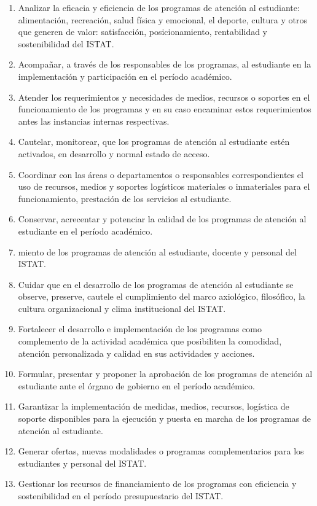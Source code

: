 \begin{enumerate}
\item Analizar la eficacia y eficiencia de los programas de atención al estudiante: alimentación, recreación, salud física y emocional, el deporte, cultura y otros que generen de valor: satisfacción, posicionamiento, rentabilidad y sostenibilidad del ISTAT. 
\item Acompañar, a través de los responsables de los programas, al estudiante en la implementación y participación en el período académico. 
\item Atender los requerimientos y necesidades de medios, recursos o soportes en el funcionamiento de los programas y en su caso encaminar estos requerimientos antes las instancias internas respectivas. 
\item Cautelar, monitorear, que los programas de atención al estudiante estén activados, en desarrollo y normal estado de acceso.  
\item Coordinar con las áreas o departamentos o responsables correspondientes el uso de recursos, medios y soportes logísticos materiales o inmateriales para el funcionamiento, prestación de los servicios al estudiante. 
\item Conservar, acrecentar y potenciar la calidad de los programas de atención al estudiante en el período académico. 
\item miento de los programas de atención al estudiante, docente y personal del ISTAT. 
\item Cuidar que en el desarrollo de los programas de atención al estudiante se observe, preserve, cautele el cumplimiento del marco axiológico, filosófico, la cultura organizacional y clima institucional del ISTAT. 
\item Fortalecer el desarrollo e implementación de los programas como complemento de la actividad académica que posibiliten la comodidad, atención personalizada y calidad en sus actividades y acciones.  
\item Formular, presentar y proponer la aprobación de los programas de atención al estudiante ante el órgano de gobierno en el período académico. 
\item Garantizar la implementación de medidas, medios, recursos, logística de soporte disponibles para la ejecución y puesta en marcha de los programas de atención al estudiante. 
\item Generar ofertas, nuevas modalidades o programas complementarios para los estudiantes y personal del ISTAT. 
\item Gestionar los recursos de financiamiento de los programas con eficiencia y sostenibilidad en el período presupuestario del ISTAT. 

\end{enumerate}
